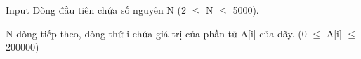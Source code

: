 Input
Dòng đầu tiên chứa số nguyên N (2  $\le$  N  $\le$  5000).  

   N dòng tiếp theo, dòng thứ i chứa giá trị của phần tử A[i] của dãy. (0  $\le$  A[i]  $\le$  200000)